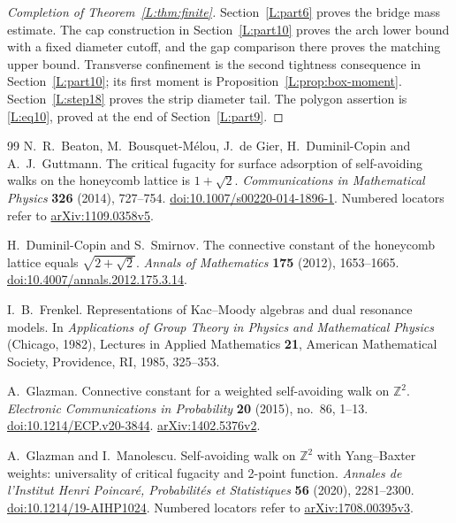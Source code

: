 \documentclass[11pt]{article}
\numberwithin{equation}{section}
\theoremstyle{definition}\newtheorem{definition}[theorem]{Definition}
\theoremstyle{remark}\newtheorem{remark}[theorem]{Remark}
\begin{document}
\begin{proof}[Completion of Theorem~\ref{L:thm:finite}]
Section~\ref{L:part6} proves the bridge mass estimate. The cap construction
in Section~\ref{L:part10} proves the arch lower bound with a fixed diameter
cutoff, and the gap comparison there proves the matching upper bound. Transverse confinement is the second tightness
consequence in Section~\ref{L:part10}; its first moment is
Proposition~\ref{L:prop:box-moment}. Section~\ref{L:step18} proves the
strip diameter tail. The polygon assertion is \eqref{L:eq10}, proved at
the end of Section~\ref{L:part9}.
\end{proof}

\begin{thebibliography}{99}
N.~R.~Beaton, M.~Bousquet-M\'elou, J.~de Gier, H.~Duminil-Copin and A.~J.~Guttmann.
The critical fugacity for surface adsorption of self-avoiding walks on the
honeycomb lattice is $1+\sqrt2$.
\emph{Communications in Mathematical Physics} \textbf{326} (2014), 727--754.
\href{https://doi.org/10.1007/s00220-014-1896-1}{doi:10.1007/s00220-014-1896-1}.
Numbered locators refer to \href{https://arxiv.org/abs/1109.0358v5}{arXiv:1109.0358v5}.

H.~Duminil-Copin and S.~Smirnov.
The connective constant of the honeycomb lattice equals $\sqrt{2+\sqrt2}$.
\emph{Annals of Mathematics} \textbf{175} (2012), 1653--1665.
\href{https://doi.org/10.4007/annals.2012.175.3.14}{doi:10.4007/annals.2012.175.3.14}.

I.~B.~Frenkel.
Representations of Kac--Moody algebras and dual resonance models.
In \emph{Applications of Group Theory in Physics and Mathematical Physics}
(Chicago, 1982), Lectures in Applied Mathematics \textbf{21}, American
Mathematical Society, Providence, RI, 1985, 325--353.

A.~Glazman.
Connective constant for a weighted self-avoiding walk on $\mathbb Z^2$.
\emph{Electronic Communications in Probability} \textbf{20} (2015), no.~86, 1--13.
\href{https://doi.org/10.1214/ECP.v20-3844}{doi:10.1214/ECP.v20-3844}.
\href{https://arxiv.org/abs/1402.5376v2}{arXiv:1402.5376v2}.

A.~Glazman and I.~Manolescu.
Self-avoiding walk on $\mathbb Z^2$ with Yang--Baxter weights:
universality of critical fugacity and 2-point function.
\emph{Annales de l'Institut Henri Poincar\'e, Probabilit\'es et Statistiques}
\textbf{56} (2020), 2281--2300.
\href{https://doi.org/10.1214/19-AIHP1024}{doi:10.1214/19-AIHP1024}.
Numbered locators refer to \href{https://arxiv.org/abs/1708.00395v3}{arXiv:1708.00395v3}.


\end{thebibliography}
\end{document}
